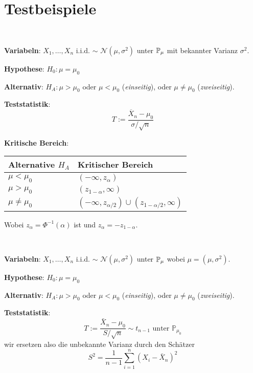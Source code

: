 \section*{Testbeispiele}
 \\

\textbf{Variabeln}: $X_1, \ldots , X_n$ i.i.d. $\sim$ $\mathcal{N}(\mu, \sigma^2)$ unter $\mathbb{P}_\mu$ mit bekannter Varianz $\sigma^2$.

\textbf{Hypothese}: $H_0 : \mu = \mu_0$

\textbf{Alternativ}: $H_A : \mu > \mu_0$ oder $\mu < \mu_0$ (\textit{einseitig}), oder $\mu \neq \mu_0$ (\textit{zweiseitig}).

\textbf{Teststatistik}: $$T := \frac{\overline{X}_n - \mu_0}{\sigma / \sqrt{n}}$$

\textbf{Kritische Bereich}: \renewcommand\arraystretch{1.8}
\begin{center}
    \begin{tabular}{l|l}
  		Alternative $H_A$ & Kritischer Bereich \\
  		\hline
  		$\mu < \mu_0 $ & $(-\infty, z_\alpha)$ \\
  		\hline
  		$\mu > \mu_0$ & $(z_{1-\alpha}, \infty)$ \\
  		\hline
  		$\mu \neq \mu_0$ & $(-\infty, z_{\alpha/2}) \cup (z_{1-\alpha/2}, \infty)$ 
	\end{tabular}
\end{center}
\renewcommand{\arraystretch}{1}
Wobei $z_\alpha = \Phi^{-1}(\alpha)$ ist und $z_\alpha = -z_{1-\alpha}$.

 \\

\textbf{Variabeln}: $X_1, \ldots , X_n$ i.i.d. $\sim$ $\mathcal{N}(\mu, \sigma^2)$ unter $\mathbb{P}_\mu$ wobei $\mu = (\mu, \sigma^2)$.

\textbf{Hypothese}: $H_0 : \mu = \mu_0$

\textbf{Alternativ}: $H_A : \mu > \mu_0$ oder $\mu < \mu_0$ (\textit{einseitig}), oder $\mu \neq \mu_0$ (\textit{zweiseitig}).

\textbf{Teststatistik}:
$$
T:=\frac{\bar{X}_{n}-\mu_{0}}{S / \sqrt{n}} \sim t_{n-1} \text { unter } \mathbb{P}_{\mu_{0}}
$$
wir ersetzen also die unbekannte Varianz durch den Schätzer
$$
S^{2}=\frac{1}{n-1} \sum_{i=1}^{n}\left(X_{i}-\bar{X}_{n}\right)^{2}
$$

